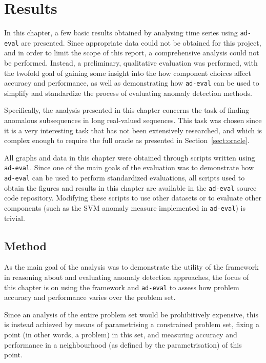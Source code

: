 \chapter{Results}
\label{ch:results}

In this chapter, a few basic results obtained by analysing time series using \texttt{ad-eval} are presented. Since appropriate data could not be obtained for this project, and in order to limit the scope of this report, a comprehensive analysis could not be performed. Instead, a preliminary, qualitative evaluation was performed, with the twofold goal of gaining some insight into the how component choices affect accuracy and performance, as well as demonstrating how \texttt{ad-eval} can be used to simplify and standardize the process of evaluating anomaly detection methods.

Specifically, the analysis presented in this chapter concerns the task of finding anomalous subsequences in long real-valued sequences. This task was chosen since it is a very interesting task that has not been extensively researched, and which is complex enough to require the full oracle as presented in Section~\ref{sect:oracle}.

All graphs and data in this chapter were obtained through scripts written using \texttt{ad-eval}. Since one of the main goals of the evaluation was to demonstrate how \texttt{ad-eval} can be used to perform standardized evaluations, all scripts used to obtain the figures and results in this chapter are available in the \texttt{ad-eval} source code repository. Modifying these scripts to use other datasets or to evaluate other components (such as the SVM anomaly measure implemented in \texttt{ad-eval}) is trivial.

\section{Method}
As the main goal of the analysis was to demonstrate the utility of the framework in reasoning about and evaluating anomaly detection approaches, the focus of this chapter is on using the framework and \texttt{ad-eval} to assess how problem accuracy and performance varies over the problem set.

Since an analysis of the entire problem set would be prohibitively expensive, this is instead achieved by means of parametrising a constrained problem set, fixing a point (in other words, a problem) in this set, and measuring accuracy and performance in a neighbourhood (as defined by the parametrisation) of this point.

